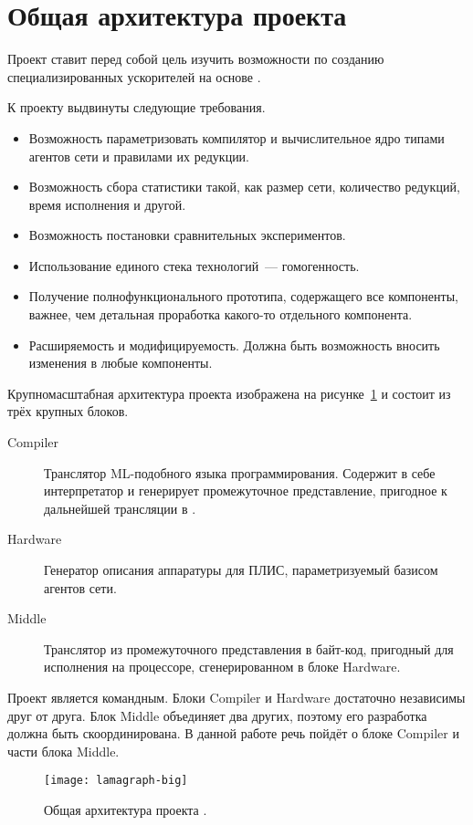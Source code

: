 
\section{Общая архитектура проекта}
\label{sec:big-arch}

Проект \Lamagraph{} ставит перед собой цель изучить возможности по созданию специализированных ускорителей на основе \INs{}.

К проекту выдвинуты следующие требования.
\begin{itemize}
    \item Возможность параметризовать компилятор и вычислительное ядро типами агентов сети и правилами их редукции.
    \item Возможность сбора статистики такой, как размер сети, количество редукций, время исполнения и другой.
    \item Возможность постановки сравнительных экспериментов.
    \item Использование единого стека технологий~--- гомогенность.
    \item Получение полнофункционального прототипа, содержащего все компоненты, важнее, чем детальная проработка какого-то отдельного компонента.
    \item Расширяемость и модифицируемость.
          Должна быть возможность вносить изменения в любые компоненты.
\end{itemize}


Крупномасштабная архитектура проекта изображена на рисунке~\ref{fig:lamagraph-big} и состоит из трёх крупных блоков.
\begin{description}
    \item[Compiler] Транслятор ML-подобного языка программирования.
          Содержит в себе интерпретатор и генерирует промежуточное представление, пригодное к дальнейшей трансляции в \INs{}.
    \item[Hardware] Генератор описания аппаратуры для ПЛИС, параметризуемый базисом агентов сети.
    \item[Middle] Транслятор из промежуточного представления в байт-код, пригодный для исполнения на процессоре, сгенерированном в блоке Hardware.
\end{description}


Проект является командным.
Блоки Compiler и Hardware достаточно независимы друг от друга.
Блок Middle объединяет два других, поэтому его разработка должна быть скоординирована.
В данной работе речь пойдёт о блоке Compiler и части блока Middle.

\begin{figure}
    \begin{center}
        \texttt{[image: lamagraph-big]}
    \end{center}
    \caption{Общая архитектура проекта \Lamagraph{}.}
    \label{fig:lamagraph-big}
\end{figure}
